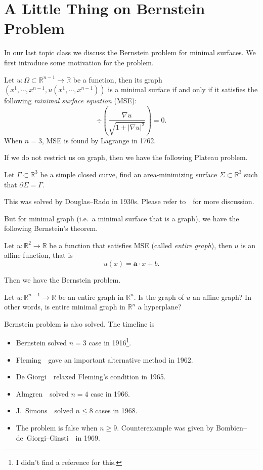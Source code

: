 \chapter{A Little Thing on Bernstein Problem}
In our last topic class we discuss the Bernstein problem for minimal surfaces.
We first introduce some motivation for the problem.

Let $u:\Omega\subset\mathbb{R}^{n-1}\to\mathbb{R}$ be a function, then its graph $(x^1,\cdots,x^{n-1},u(x^1,\cdots,x^{n-1}))$ is a minimal surface if and only if it satisfies the following \emph{minimal surface equation} (MSE):
\[\div\left(\frac{\nabla u}{\sqrt{1+|\nabla u|^2}}\right)=0.\]
When $n=3$, MSE is found by Lagrange in 1762.

If we do not restrict us on graph, then we have the following Plateau problem.
\begin{pro}[Plateau]
    Let $\Gamma\subset\mathbb{R}^3$ be a simple closed curve, find an area-minimizing surface $\Sigma\subset\mathbb{R}^3$ such that $\partial\Sigma=\Gamma$.
\end{pro}

This was solved by Douglas--Rado in 1930s.
Please refer to~\cite{Struwe}~for more discussion.

But for minimal graph (i.e.\ a minimal surface that is a graph), we have the following Bernstein's theorem.
\begin{thm}[Bernstein, 1916]
    Let $u:\mathbb{R}^2\to\mathbb{R}$ be a function that satisfies MSE (called \emph{entire graph}), then $u$ is an affine function, that is
    \[u(x)=\mathbf{a}\cdot x+b.\]
\end{thm}

Then we have the Bernstein problem.
\begin{pro}[Bernstein]
    Let $u:\mathbb{R}^{n-1}\to\mathbb{R}$ be an entire graph in $\mathbb{R}^n$.
    Is the graph of $u$ an affine graph?
    In other words, is entire minimal graph in $\mathbb{R}^n$ a hyperplane?
\end{pro}

Bernstein problem is also solved.
The timeline is
\begin{itemize}
    \item Bernstein solved $n=3$ case in 1916\footnote{I didn't find a reference for this.}.
    \item Fleming~\cite{Fleming}~gave an important alternative method in 1962.
    \item De Giorgi~\cite{deGiorgi}~relaxed Fleming's condition in 1965.
    \item Almgren~\cite{Almgren}~solved $n=4$ case in 1966.
    \item J.\ Simons~\cite{Simons}~solved $n\leq 8$ cases in 1968.
    \item The problem is false when $n\geq 9$.
    Counterexample was given by Bombien--de~Giorgi--Ginsti~\cite{Bombieri}~in 1969.
\end{itemize}

